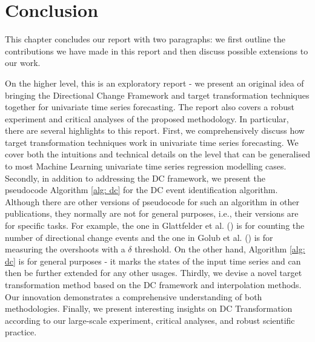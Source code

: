 \chapter{Conclusion}\label{ch: conclusion}
This chapter concludes our report with two paragraphs: we first outline the contributions we have made in this report and then discuss possible extensions to our work.

On the higher level, this is an exploratory report - we present an original idea of bringing the Directional Change Framework and target transformation techniques together for univariate time series forecasting. The report also covers a robust experiment and critical analyses of the proposed methodology. In particular, there are several highlights to this report. First, we comprehensively discuss how target transformation techniques work in univariate time series forecasting. We cover both the intuitions and technical details on the level that can be generalised to most Machine Learning univariate time series regression modelling cases. Secondly, in addition to addressing the DC framework, we present the pseudocode Algorithm \ref{alg: dc} for the DC event identification algorithm. Although there are other versions of pseudocode for such an algorithm in other publications, they normally are not for general purposes, i.e., their versions are for specific tasks. For example, the one in Glattfelder et al. (\citeyear{glattfelder2011patterns}) is for counting the number of directional change events and the one in Golub et al. (\citeyear{golub2016multi}) is for measuring the overshoots with a $\delta$ threshold. On the other hand, Algorithm \ref{alg: dc} is for general purposes - it marks the states of the input time series and can then be further extended for any other usages. Thirdly, we devise a novel target transformation method based on the DC framework and interpolation methods. Our innovation demonstrates a comprehensive understanding of both methodologies. Finally, we present interesting insights on DC Transformation according to our large-scale experiment, critical analyses, and robust scientific practice.

